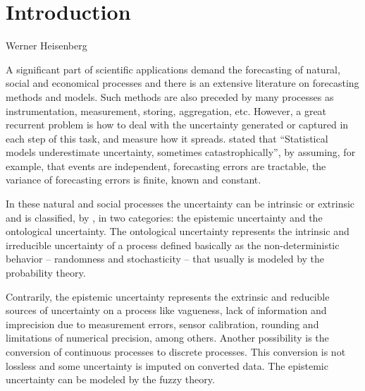 \chapter[Introduction]{Introduction} 
\label{chap:Intro} 

{Werner Heisenberg}

A significant part of scientific applications demand the forecasting of natural, social and economical processes and there is an extensive literature on forecasting methods and models. Such methods are also preceded by many  processes as instrumentation, measurement, storing, aggregation, etc. However, a great recurrent problem is how to deal with the uncertainty generated or captured in each step of this task, and measure how it spreads. \cite{Makridakis2009} stated that ``Statistical models underestimate uncertainty, sometimes catastrophically'', by assuming, for example, that events are independent, forecasting errors are tractable, the variance of forecasting errors is finite, known and constant. 


In these natural and social processes the uncertainty can be intrinsic or extrinsic and is classified, by \cite{Georgescu2014}, in two categories: the epistemic uncertainty and the ontological uncertainty. The ontological uncertainty represents the intrinsic and irreducible uncertainty of a process defined basically as the non-deterministic behavior -- randomness and stochasticity -- that usually is modeled by the probability theory. 


Contrarily, the epistemic uncertainty represents the extrinsic and reducible sources of uncertainty on a process like vagueness, lack of information and imprecision due to measurement errors, sensor calibration, rounding and limitations of numerical precision, among others. Another possibility is the conversion of continuous processes to discrete processes. This conversion is not lossless and some uncertainty is imputed on converted data. The epistemic uncertainty can be modeled by the fuzzy theory. 

